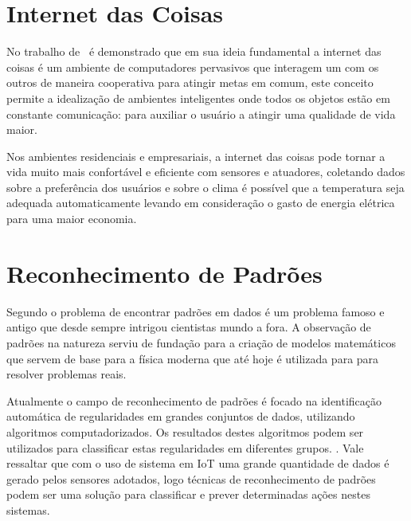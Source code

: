 


\section{Internet das Coisas}

No trabalho de~ é demonstrado que em sua ideia fundamental a internet das coisas é um ambiente de computadores pervasivos que interagem um com os outros de maneira cooperativa para atingir metas em comum, este conceito permite a idealização de ambientes inteligentes onde todos os objetos estão em constante comunicação: para auxiliar o usuário a atingir uma qualidade de vida maior.

Nos ambientes residenciais e empresariais, a internet das coisas pode tornar a vida muito mais confortável e eficiente com sensores e atuadores, coletando dados sobre a preferência dos usuários e sobre o clima é possível que a temperatura seja adequada automaticamente levando em consideração o gasto de energia elétrica para uma maior economia. \cite{ATZORI:2010}

% 


\section{Reconhecimento de Padrões}

Segundo  o problema de encontrar padrões em dados é um problema famoso e antigo que desde sempre intrigou cientistas mundo a fora. A observação de padrões na natureza serviu de fundação para a criação de modelos matemáticos que servem de base para a física moderna que até hoje é utilizada para para resolver problemas reais. 

Atualmente o campo de reconhecimento de padrões é focado na identificação automática de regularidades em grandes conjuntos de dados, utilizando algoritmos computadorizados. Os resultados destes algoritmos podem ser utilizados para classificar estas regularidades em diferentes grupos. \cite{bishop:2006}. Vale ressaltar que com o uso de sistema em IoT uma grande quantidade de dados é gerado pelos sensores adotados, logo técnicas de reconhecimento de padrões podem ser uma solução para classificar e prever determinadas ações nestes sistemas.

